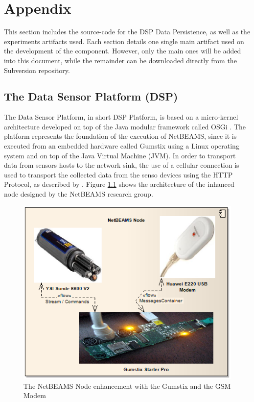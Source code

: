 \chapter{Appendix}

This section includes the source-code for the DSP Data Persistence, as well as
the experiments artifacts used. Each section details one single main artifact
used on the development of the component. However, only the main ones will be
added into this document, while the remainder can be downloaded directly from
the Subversion repository.

\section{The Data Sensor Platform (DSP)}
\label{sec:dsp-details}

The Data Sensor Platform, in short DSP Platform, is based on a micro-kernel
architecture developed on top of the Java modular framework called OSGi
\cite{osgi}. The platform represents the foundation of the execution of
NetBEAMS, since it is executed from an embedded hardware called Gumstix
\cite{gumstix} using a Linux operating system and on top of the Java Virtual
Machine (JVM). In order to transport data from sensors hosts to the network
sink, the use of a cellular connection is used to transport the collected data
from the senso devices using the HTTP Protocol, as described by
\citet{netbeams2009}. Figure \ref{fig:sf-netbeams-node} shows the
architecture of the inhanced node designed by the NetBEAMS research group.

\begin{figure}[h]
  \centering
  \includegraphics[scale=0.5]{../diagrams/DSP-Gateway-Node}
  \caption{The NetBEAMS Node enhancement with the Gumstix and the GSM Modem}
  \label{fig:sf-netbeams-node}
\end{figure}

